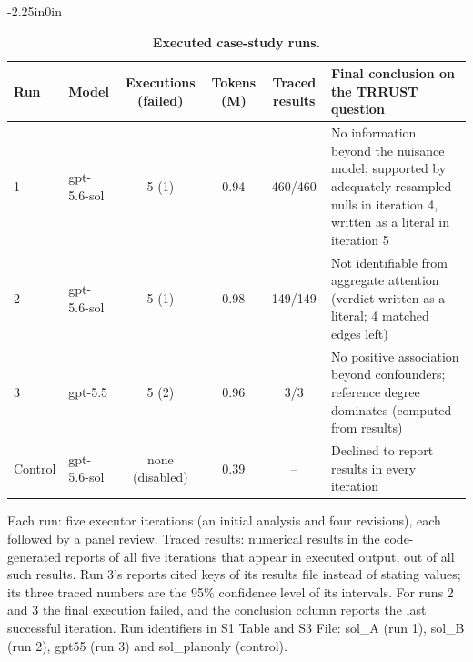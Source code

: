 \begin{table}[!ht]
\begin{adjustwidth}{-2.25in}{0in}
\centering
\caption{{\bf Executed case-study runs.}}
\label{table_case}
\begin{tabular}{@{}llcccp{6.2cm}@{}}
\hline
\textbf{Run} & \textbf{Model} & \textbf{Executions (failed)} & \textbf{Tokens (M)} & \textbf{Traced results} & \textbf{Final conclusion on the TRRUST question} \\ \hline
1 & gpt-5.6-sol & 5 (1) & 0.94 & 460/460 & No information beyond the nuisance model; supported by adequately resampled nulls in iteration 4, written as a literal in iteration 5 \\
2 & gpt-5.6-sol & 5 (1) & 0.98 & 149/149 & Not identifiable from aggregate attention (verdict written as a literal; 4 matched edges left) \\
3 & gpt-5.5 & 5 (2) & 0.96 & 3/3 & No positive association beyond confounders; reference degree dominates (computed from results) \\
Control & gpt-5.6-sol & none (disabled) & 0.39 & -- & Declined to report results in every iteration \\ \hline
\end{tabular}
\begin{flushleft} Each run: five executor iterations (an initial analysis and four revisions), each followed by a panel review. Traced results: numerical results in the code-generated reports of all five iterations that appear in executed output, out of all such results. Run 3's reports cited keys of its results file instead of stating values; its three traced numbers are the 95\% confidence level of its intervals. For runs 2 and 3 the final execution failed, and the conclusion column reports the last successful iteration. Run identifiers in S1 Table and S3 File: sol\_A (run 1), sol\_B (run 2), gpt55 (run 3) and sol\_planonly (control).
\end{flushleft}
\end{adjustwidth}
\end{table}
